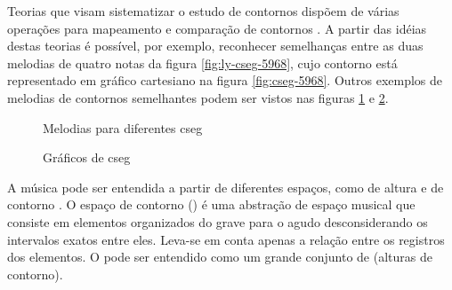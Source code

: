 Teorias que visam sistematizar o estudo de contornos dispõem de várias
operações para mapeamento e comparação de contornos
\cite{friedmann85:methodology,friedmann87:response,morris87:composition,morris93:directions,marvin.ea87:relating,clifford95:contour,polansky.ea92:possible,quinn97:fuzzy,beard03:contour}
. A partir das idéias destas teorias é
possível, por exemplo, reconhecer semelhanças entre as duas melodias
de quatro notas da figura \ref{fig:ly-cseg-5968}, cujo contorno está
representado em gráfico cartesiano na figura
\ref{fig:cseg-5968}. Outros exemplos de melodias de contornos
semelhantes podem ser vistos nas figuras \ref{fig:melodias-cseg} e
\ref{fig:graficos-cseg}.

\begin{figure}
  \centering

  \caption{Melodias para diferentes cseg}
  \label{fig:melodias-cseg}
\end{figure}

\begin{figure}
  \centering
  \caption{Gráficos de cseg}
  \label{fig:graficos-cseg}
\end{figure}

A música pode ser entendida a partir de  diferentes
espaços, como de altura e de contorno \cite{morris87:composition}. O
espaço de contorno () é uma abstração de espaço musical
que consiste em elementos organizados do grave para o agudo
desconsiderando os intervalos exatos entre eles. Leva-se em conta
apenas a relação entre os registros dos elementos. O  pode
ser entendido como um grande conjunto de  (alturas de
contorno).

